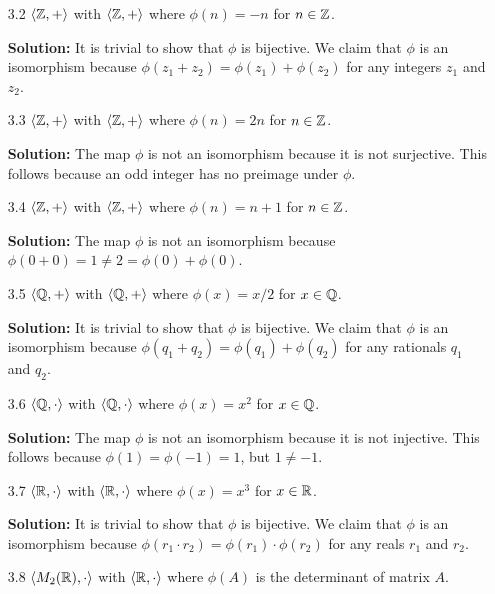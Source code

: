 \begin{enumerate}
   \item[3.2] $\langle \mathbb{Z}, + \rangle$ with $\langle \mathbb{Z}, + \rangle$ where $\phi(n) = -n$ for
              $n \in \mathbb{Z}$.

      \textbf{Solution:} It is trivial to show that $\phi$ is bijective. We 
      claim that $\phi$ is an isomorphism because
      $\phi(z_1 + z_2) = \phi(z_1) + \phi(z_2)$ for any integers $z_1$ and
      $z_2$.
   \item[3.3] $\langle \mathbb{Z}, + \rangle$ with $\langle \mathbb{Z}, + \rangle$ where $\phi(n) = 2n$ for
              $n \in \mathbb{Z}$.

      \textbf{Solution:} The map $\phi$ is not an isomorphism because it is not
      surjective. This follows because an odd integer has no preimage under
      $\phi$.
   \item[3.4] $\langle \mathbb{Z}, + \rangle$ with $\langle \mathbb{Z}, + \rangle$ where $\phi(n) = n + 1$ for
              $n \in \mathbb{Z}$.

      \textbf{Solution:} The map $\phi$ is not an isomorphism because
      $\phi(0 + 0) = 1 \neq 2 = \phi(0) + \phi(0)$.
   \item[3.5] $\langle \mathbb{Q}, + \rangle$ with $\langle \mathbb{Q}, + \rangle$ where $\phi(x) = x/2$ for
              $x \in \mathbb{Q}$.

      \textbf{Solution:} It is trivial to show that $\phi$ is bijective. We 
      claim that $\phi$ is an isomorphism because
      $\phi(q_1 + q_2) = \phi(q_1) + \phi(q_2)$ for any rationals $q_1$ and
      $q_2$.
   \item[3.6] $\langle \mathbb{Q}, \cdot \rangle$ with $\langle \mathbb{Q}, \cdot \rangle$ where $\phi(x) = x^2$ for
              $x \in \mathbb{Q}$.

      \textbf{Solution:} The map $\phi$ is not an isomorphism because it is not
      injective. This follows because $\phi(1) = \phi(-1) = 1$, but $1 \neq -1$.
   \item[3.7] $\langle \mathbb{R}, \cdot \rangle$ with $\langle \mathbb{R}, \cdot \rangle$ where $\phi(x) = x^3$ for
              $x \in \mathbb{R}$.

      \textbf{Solution:} It is trivial to show that $\phi$ is bijective. We 
      claim that $\phi$ is an isomorphism because
      $\phi(r_1 \cdot r_2) = \phi(r_1) \cdot \phi(r_2)$ for any reals $r_1$ and
      $r_2$.
   \item[3.8] $\langle M_2(\mathbb{R}), \cdot \rangle$ with $\langle \mathbb{R}, \cdot \rangle$ where $\phi(A)$ is
              the determinant of matrix $A$.


\end{enumerate}
